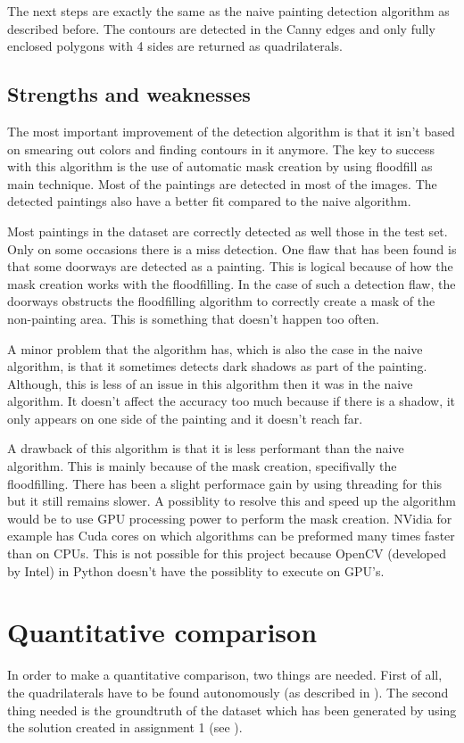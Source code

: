 The next steps are exactly the same as the naive painting detection algorithm as described before. The contours are detected in the Canny edges and only fully enclosed polygons with 4 sides are returned as quadrilaterals.

\subsection{Strengths and weaknesses}

The most important improvement of the detection algorithm is that it isn't based on smearing out colors and finding contours in it anymore. The key to success with this algorithm is the use of automatic mask creation by using floodfill as main technique. Most of the paintings are detected in most of the images. The detected paintings also have a better fit compared to the naive algorithm.

Most paintings in the dataset are correctly detected as well those in the test set. Only on some occasions there is a miss detection. One flaw that has been found is that some doorways are detected as a painting. This is logical because of how the mask creation works with the floodfilling. In the case of such a detection flaw, the doorways obstructs the floodfilling algorithm to correctly create a mask of the non-painting area. This is something that doesn't happen too often.

A minor problem that the algorithm has, which is also the case in the naive algorithm, is that it sometimes detects dark shadows as part of the painting. Although, this is less of an issue in this algorithm then it was in the naive algorithm. It doesn't affect the accuracy too much because if there is a shadow, it only appears on one side of the painting and it doesn't reach far.

A drawback of this algorithm is that it is less performant than the naive algorithm. This is mainly because of the mask creation, specifivally the floodfilling. There has been a slight performace gain by using threading for this but it still remains slower. A possiblity to resolve this and speed up the algorithm would be to use GPU processing power to perform the mask creation. NVidia for example has Cuda cores on which algorithms can be preformed many times faster than on CPUs. This is not possible for this project because OpenCV (developed by Intel) in Python doesn't have the possiblity to execute on GPU's.

\section{Quantitative comparison}
In order to make a quantitative comparison, two things are needed. First of all, the quadrilaterals have to be found autonomously (as described in ). The second thing needed is the groundtruth of the dataset which has been generated by using the solution created in assignment 1 (see ).

